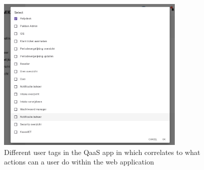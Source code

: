 \begin{figure}[htbp]
      \centering
      \includegraphics[width=0.8\textwidth]{Figures/Qaas App/Modules/afbeelding (2).png}
      \caption{Different user tags in the QaaS app in which correlates to what actions can a user do within the web application}
      \label{fig:userTages}
\end{figure}

